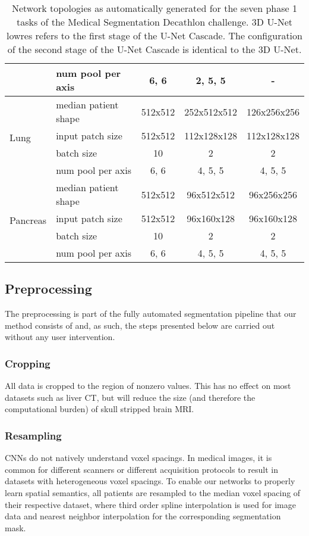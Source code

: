 \documentclass{templates/llncs}
\begin{document}
\begin{table}[t]
\begin{tabular}{ll|ccc}
     & num pool per axis & 6, 6 & 2, 5, 5 & - \\
    \hline
    \multirow{4}{*}{Lung} & median patient shape & 512x512 & 252x512x512 & 126x256x256 \\
     & input patch size & 512x512 & 112x128x128 & 112x128x128 \\
     & batch size & 10 & 2 & 2 \\
     & num pool per axis & 6, 6 & 4, 5, 5 & 4, 5, 5 \\
    \hline
    \multirow{4}{*}{Pancreas} & median patient shape & 512x512 & 96x512x512 & 96x256x256 \\
     & input patch size & 512x512 & 96x160x128 & 96x160x128 \\
     & batch size & 10 & 2 & 2 \\
     & num pool per axis & 6, 6 & 4, 5, 5 & 4, 5, 5\\
     \hline
    \end{tabular}
    \caption{Network topologies as automatically generated for the seven phase 1 tasks of the Medical Segmentation Decathlon challenge. 3D U-Net lowres refers to the first stage of the U-Net Cascade. The configuration of the second stage of the U-Net Cascade is identical to the 3D U-Net.}
    \end{table}
    \subsection{Preprocessing}
    The preprocessing is part of the fully automated segmentation pipeline that our method consists of and, as such, the steps presented below are carried out without any user intervention. 
    
    \subsubsection{Cropping}
    All data is cropped to the region of nonzero values. This has no effect on most datasets such as liver CT, but will reduce the size (and therefore the computational burden) of skull stripped brain MRI. 
    
    \subsubsection{Resampling}
    \label{resampling}
    CNNs do not natively understand voxel spacings. In medical images, it is common for different scanners or different acquisition protocols to result in datasets with heterogeneous voxel spacings. To enable our networks to properly learn spatial semantics, all patients are resampled to the median voxel spacing of their respective dataset, where third order spline interpolation is used for image data and nearest neighbor interpolation for the corresponding segmentation mask.
    
\end{document}
